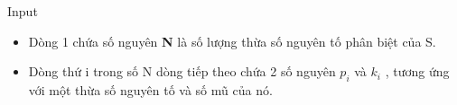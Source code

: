 Input
\begin{itemize}
	\item     Dòng 1 chứa số nguyên    \textbf{     N    }    là số lượng thừa số nguyên tố phân biệt của S.   
	\item     Dòng thứ i trong số N dòng tiếp theo chứa 2 số nguyên    \textbf{     $p_{i}$}    và    \textbf{     $k_{i}$}    , tương ứng với một thừa số nguyên tố và số mũ của nó.   
\end{itemize}